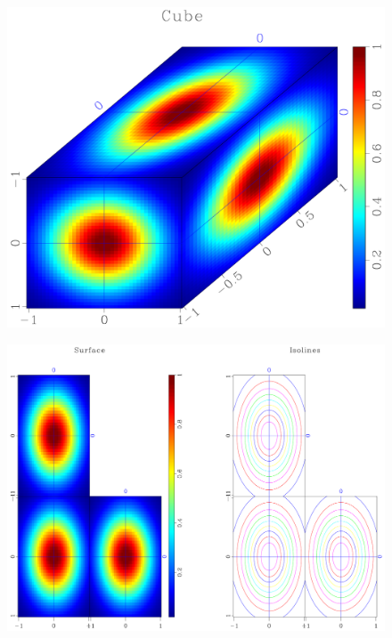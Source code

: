 \begin{frame}
  \begin{figure}
  \includegraphics[scale=0.25]{plot/Fig/ganom3.pdf}
  \end{figure}
\end{frame}

\begin{frame}
  \begin{figure}
  \includegraphics[scale=0.25]{plot/Fig/sganom.pdf}
  \end{figure}
\end{frame}

